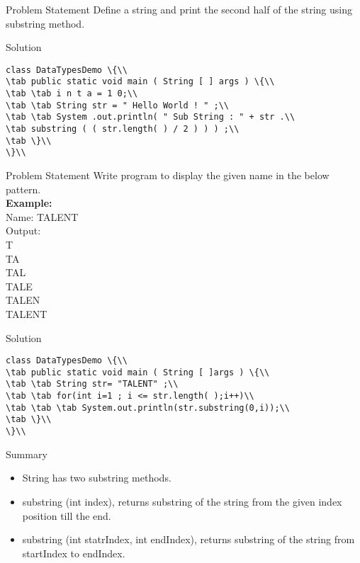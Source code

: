 \documentclass[aspectratio=169,14pt,usenames,dvipsnames]{beamer}
\newcommand\tab[1][1cm]{\hspace*{#1}}
\begin{document}
\begin{frame}{Problem Statement}
Define a string and print the second half of the string
using substring method.
\end{frame}  


\begin{frame}{Solution}
\begin{lstlisting}
class DataTypesDemo \{\\
\tab public static void main ( String [ ] args ) \{\\
\tab \tab i n t a = 1 0;\\
\tab \tab String str = " Hello World ! " ;\\
\tab \tab System .out.println( " Sub String : " + str .\\
\tab substring ( ( str.length( ) / 2 ) ) ) ;\\
\tab \}\\
\}\\
\end{lstlisting}
\end{frame}

\begin{frame}{Problem Statement}
Write program to display the given name in the below
pattern.\\
\textbf{Example:}\\
Name: TALENT\\
Output:\\
T\\
TA\\
TAL\\
TALE\\
TALEN\\
TALENT\\
\end{frame}

\begin{frame}{Solution}
\begin{lstlisting}
class DataTypesDemo \{\\
\tab public static void main ( String [ ]args ) \{\\
\tab \tab String str= "TALENT" ;\\
\tab \tab for(int i=1 ; i <= str.length( );i++)\\
\tab \tab \tab System.out.println(str.substring(0,i));\\
\tab \}\\
\}\\
\end{lstlisting}
\end{frame}


\begin{frame}{Summary}
\begin{itemize}
    \item String has two substring methods.
    \item substring (int index), returns substring of the string
from the given index position till the end.
\item substring (int statrIndex, int endIndex), returns
substring of the string from startIndex to endIndex.
\end{itemize}
\end{frame}
\end{document}
